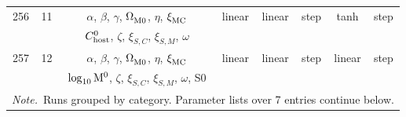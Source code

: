 \begin{longtable}{c c c c c c c c}
    256 & 11 & $\alpha$, $\beta$, $\gamma$, $\Omega_{\rm M0}^{}$, $\eta$, $\xi_{\rm MC}^{}$ & linear & linear & step & tanh & step \\
    \multicolumn{1}{c}{} & \multicolumn{1}{c}{} & $C_{\rm host}^{0}$, $\zeta$, $\xi_{S,C}^{}$, $\xi_{S,M}^{}$, $\omega$ & \multicolumn{1}{c}{} & \multicolumn{1}{c}{} & \multicolumn{1}{c}{} & \multicolumn{1}{c}{} & \multicolumn{1}{c}{} \\
    257 & 12 & $\alpha$, $\beta$, $\gamma$, $\Omega_{\rm M0}^{}$, $\eta$, $\xi_{\rm MC}^{}$ & linear & linear & step & linear & step \\
    \multicolumn{1}{c}{} & \multicolumn{1}{c}{} & $\log_{10}^{}{\rm M}^0$, $\zeta$, $\xi_{S,C}^{}$, $\xi_{S,M}^{}$, $\omega$, S0 & \multicolumn{1}{c}{} & \multicolumn{1}{c}{} & \multicolumn{1}{c}{} & \multicolumn{1}{c}{} & \multicolumn{1}{c}{} \\
    \multicolumn{8}{l}{\textit{Note.}~Runs grouped by category.  Parameter lists over 7 entries continue below.}
\end{longtable}
\twocolumngrid
